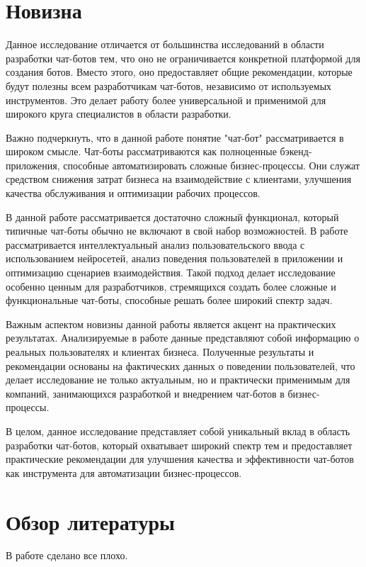 \documentclass{article}
\begin{document}
\section{Новизна}
Данное исследование отличается от большинства исследований в области разработки чат-ботов тем, что оно не ограничивается конкретной платформой для создания ботов. Вместо этого, оно предоставляет общие рекомендации, которые будут полезны всем разработчикам чат-ботов, независимо от используемых инструментов. Это делает работу более универсальной и применимой для широкого круга специалистов в области разработки.

Важно подчеркнуть, что в данной работе понятие "чат-бот" рассматривается в широком смысле. Чат-боты рассматриваются как полноценные бэкенд-приложения, способные автоматизировать сложные бизнес-процессы. Они служат средством снижения затрат бизнеса на взаимодействие с клиентами, улучшения качества обслуживания и оптимизации рабочих процессов.

В данной работе рассматривается достаточно сложный функционал, который типичные чат-боты обычно не включают в свой набор возможностей. В работе рассматривается интеллектуальный анализ пользовательского ввода с использованием нейросетей, анализ поведения пользователей в приложении и оптимизацию сценариев взаимодействия. Такой подход делает исследование особенно ценным для разработчиков, стремящихся создать более сложные и функциональные чат-боты, способные решать более широкий спектр задач.

Важным аспектом новизны данной работы является акцент на практических результатах. Анализируемые в работе данные представляют собой информацию о реальных пользователях и клиентах бизнеса. Полученные результаты и рекомендации основаны на фактических данных о поведении пользователей, что делает исследование не только актуальным, но и практически применимым для компаний, занимающихся разработкой и внедрением чат-ботов в бизнес-процессы.

В целом, данное исследование представляет собой уникальный вклад в область разработки чат-ботов, который охватывает широкий спектр тем и предоставляет практические рекомендации для улучшения качества и эффективности чат-ботов как инструмента для автоматизации бизнес-процессов.
\section{Обзор литературы}
В работе \cite{1} сделано все плохо.
\end{document}
